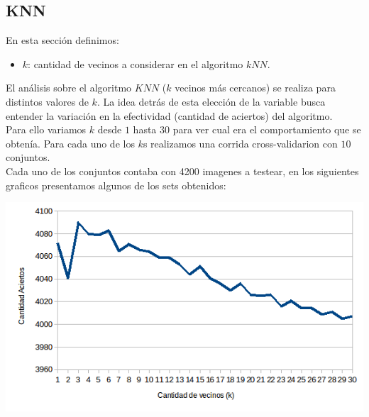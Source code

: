 \subsection{KNN}
En esta sección definimos:
\begin{itemize}
	\item $k$: cantidad de vecinos a considerar en el algoritmo $kNN$.
\end{itemize}
El análisis sobre el algoritmo $KNN$ ($k$ vecinos más cercanos) se realiza para distintos valores de $k$. La idea detrás de esta elección de la variable busca entender la variación en la efectividad (cantidad de aciertos) del algoritmo.
\\
Para ello variamos $k$ desde $1$ hasta $30$ para ver cual era el comportamiento que se obtenía. Para cada uno de los $k$s realizamos una corrida cross-validarion con $10$ conjuntos.
\\
Cada uno de los conjuntos contaba con 4200 imagenes a testear, en los siguientes graficos presentamos algunos de los sets obtenidos:

\includegraphics[scale=0.55]{nuevosResultados/knn/1.png}\\

